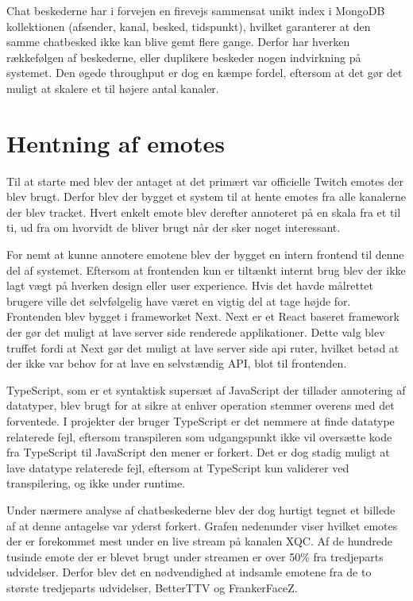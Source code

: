 \documentclass{article}
\begin{document}
Chat beskederne har i forvejen en firevejs sammensat unikt index i MongoDB kollektionen (afsender, kanal, besked, tidspunkt), hvilket garanterer at den samme chatbesked ikke kan blive gemt flere gange. Derfor har hverken rækkefølgen af beskederne, eller duplikere beskeder nogen indvirkning på systemet. Den øgede throughput er dog en kæmpe fordel, eftersom at det gør det muligt at skalere et til højere antal kanaler.

\section{Hentning af emotes}
Til at starte med blev der antaget at det primært var officielle Twitch emotes der blev brugt. Derfor blev der bygget et system til at hente emotes fra alle kanalerne der blev tracket. Hvert enkelt emote blev derefter annoteret på en skala fra et til ti, ud fra om hvorvidt de bliver brugt når der sker noget interessant.

For nemt at kunne annotere emotene blev der bygget en intern frontend til denne del af systemet. Eftersom at frontenden kun er tiltænkt internt brug blev der ikke lagt vægt på hverken design eller user experience. Hvis det havde målrettet brugere ville det selvfølgelig have været en vigtig del at tage højde for.
Frontenden blev bygget i frameworket Next. Next er et React baseret framework der gør det muligt at lave server side renderede applikationer. Dette valg blev truffet fordi at Next gør det muligt at lave server side api ruter, hvilket betød at der ikke var behov for at lave en selvstændig API, blot til frontenden.

TypeScript, som er et syntaktisk supersæt af JavaScript der tillader annotering af datatyper, blev brugt for at sikre at enhver operation stemmer overens med det forventede. I projekter der bruger TypeScript er det nemmere at finde datatype relaterede fejl, eftersom transpileren som udgangspunkt ikke vil oversætte kode fra TypeScript til JavaScript den mener er forkert. Det er dog stadig muligt at lave datatype relaterede fejl, eftersom at TypeScript kun validerer ved transpilering, og ikke under runtime.

Under nærmere analyse af chatbeskederne blev der dog hurtigt tegnet et billede af at denne antagelse var yderst forkert. Grafen nedenunder viser hvilket emotes der er forekommet mest under en live stream på kanalen XQC. Af de hundrede tusinde emote der er blevet brugt under streamen er over 50\% fra tredjeparts udvidelser. Derfor blev det en nødvendighed at indsamle emotene fra de to største tredjeparts udvidelser, BetterTTV og FrankerFaceZ.
\end{document}
